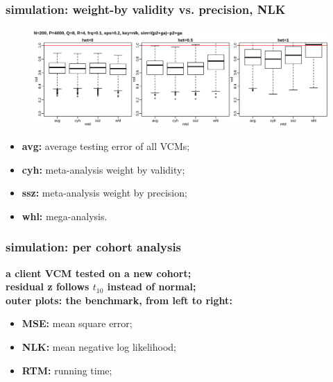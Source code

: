 \documentclass{beamer}
\begin{document}
\begin{frame}%
  \frametitle{simulation: weight-by validity vs. precision, NLK} %
  \begin{figure}
    \centering \includegraphics[width=1.0\linewidth]{img/met_mnq_cyh_nlk}
  \end{figure}
  \textbf{\color{blue}{inner plot: strategies, from left to right:}}
  \begin{itemize}
  \item \textbf{avg:} average testing error of all VCMs;
  \item \textbf{cyh:} meta-analysis weight by validity;
  \item \textbf{ssz:} meta-analysis weight by precision;
  \item \textbf{whl:} mega-analysis.
  \end{itemize}
\end{frame}
\begin{frame}\frametitle{simulation: per cohort analysis}
  \textbf{a client VCM tested on a new cohort;} \\
  \textbf{residual z follows $t_{10}$ instead of normal;} \\
  {\color{blue}\textbf{outer plots: the benchmark, from left to right:}}
  \begin{itemize}
  \item \textbf{MSE:} mean square error;
  \item \textbf{NLK:} mean negative log likelihood;
  \item \textbf{RTM:} running time;
  \end{itemize}
\end{frame}
\end{document}
